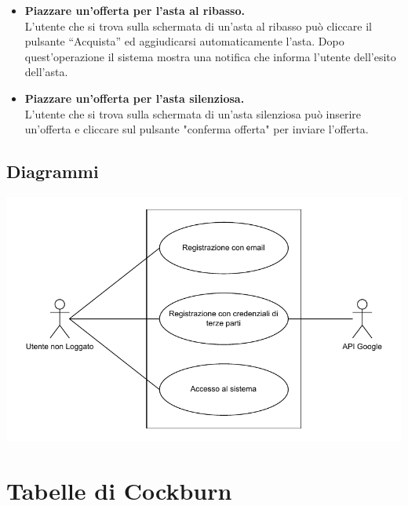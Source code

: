 \begin{itemize}
	\item \textbf{Piazzare un'offerta per l'asta al ribasso.}\\
	      L'utente che si trova sulla schermata di un'asta al ribasso può cliccare il pulsante “Acquista” ed aggiudicarsi automaticamente l'asta. Dopo quest'operazione il sistema mostra una notifica che informa l'utente dell'esito dell'asta.

	\item \textbf{Piazzare un'offerta per l'asta silenziosa.}\\
	      L'utente che si trova sulla schermata di un'asta silenziosa può inserire un'offerta e cliccare sul pulsante "conferma offerta" per inviare l'offerta.
\end{itemize}

\newpage
\subsection{Diagrammi}
\includegraphics[width=.7\textwidth]{images/utente_non_loggato_use_case_diagram.pdf}

\newpage
\section{Tabelle di Cockburn}

